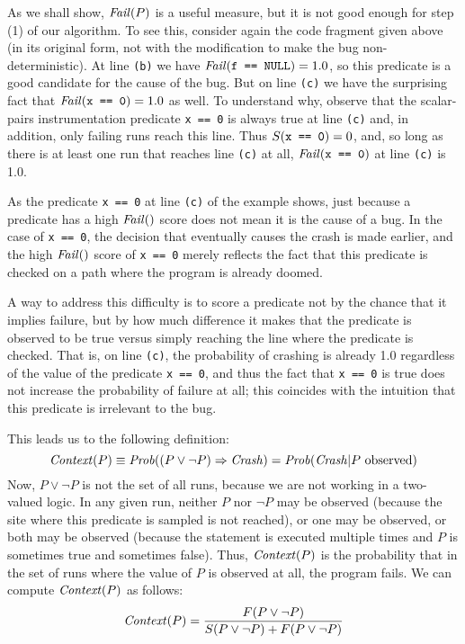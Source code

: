 As we shall show, $\mbox{\textit{Fail}}(P)$ is a useful measure, but it is not good
enough for step (1) of our algorithm. To see this, consider again the
code fragment given above (in its original form, not with the
modification to make the bug non-deterministic).  At line {\tt (b)} we
have $\mbox{\textit{Fail}}(\mbox{\tt f == NULL}) = 1.0$, so this predicate is a good
candidate for the cause of the bug.
But on line {\tt (c)} we have the surprising fact that $\mbox{\textit{Fail}}(\mbox{\tt x == 0}) = 1.0$ as well.
To understand why, observe that the scalar-pairs instrumentation
predicate \texttt{x == 0} is always true at line {\tt (c)} and, in
addition,
only failing runs reach this line.
Thus $S(\mbox{\tt x == 0}) = 0$, and, so long as there is at least one run that
reaches line {\tt (c)} at all, $\mbox{\textit{Fail}}(\mbox{\tt x == 0})$ at line {\tt (c)} is 1.0.

As the predicate {\tt x == 0} at line {\tt (c)} of the example
shows, just because a predicate has a high $\mbox{\textit{Fail}}()$ score does not
mean it is the cause of a bug.  In the case of {\tt x == 0}, the
decision that eventually causes the crash is made earlier, and the
high $\mbox{\textit{Fail}}()$ score of {\tt x == 0} merely reflects the fact that this
predicate is checked on a path where the program is already doomed.

A way to address this difficulty is to score a predicate not by the chance
that it implies failure, but by how much difference it makes that the predicate
is observed to be true versus simply reaching the line where the predicate is checked.
That is, on line {\tt (c)}, the probability of crashing is already 1.0 regardless
of the value of the predicate {\tt x == 0}, and thus the fact that {\tt x == 0} is
true does not increase the probability of failure at all; this coincides with
the intuition that this predicate is irrelevant to the bug.

This leads us to the following definition:
\[ \mbox{\textit{Context}}(P) \equiv \mbox{\textit{Prob}}((P \lor \lnot P) \Rightarrow \mbox{\textit{Crash}})  = \mbox{\textit{Prob}}(\mbox{\textit{Crash}} |  P \mbox{ observed}) \]
Now, $P \lor \lnot P$ is not the set of all runs, because we are not working in a two-valued logic.
In any given run, neither $P$ nor $\lnot P$ may be observed (because the site where this predicate is
sampled is not reached), or one may be observed, or both may be observed (because the statement is executed
multiple times and $P$ is sometimes true and sometimes false).  Thus, $\mbox{\textit{Context}}(P)$ is the probability that
in the set of runs where the value of $P$ is observed at all, the program fails. We can compute $\mbox{\textit{Context}}(P)$ as follows:
\[ \mbox{\textit{Context}}(P) = \frac{F(P \lor \lnot P)}{S(P \lor \lnot P) + F(P \lor \lnot P)} \]

